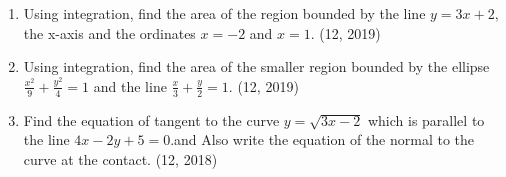 \begin{enumerate}[label=\thesubsection.\arabic*,ref=\thesubsection.\theenumi]
\item Using integration, find the area of the region bounded by the line
$y = 3x + 2,$ the x-axis and the ordinates $x = - 2$ and $x = 1$.
\hfill (12, 2019)

\item Using integration, find the area of the smaller region bounded by the ellipse $\frac{x^{2}}{9}+\frac{y^{2}}{4}=1$ and the line $\frac{x}{3}+\frac{y}{2}=1$.
\hfill (12, 2019)
\item Find the equation of tangent to the curve $y=\sqrt{3x-2}$ which is parallel to the line $4x-2y+5=0$.and Also write the equation of the normal to the curve at the contact.
\hfill (12, 2018)


\end{enumerate}
